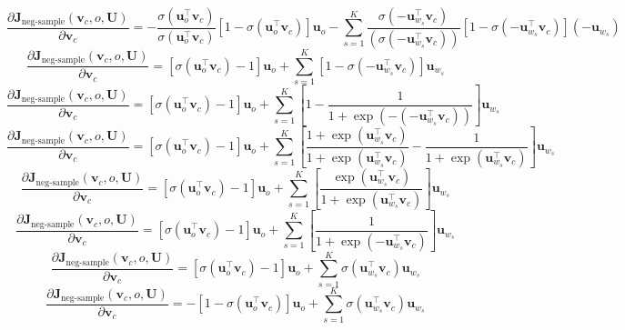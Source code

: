\documentclass[12pt]{article}
\begin{document}
\begin{equation*}
    \frac{\partial \bm J_{\text{neg-sample}}(\bm v_c, o, \bm U)}{\partial \bm v_c} = 
    - \frac{\sigma(\bm u_o^\top \bm v_c)}{\sigma(\bm u_o^\top \bm v_c)} 
    [1 - \sigma(\bm u_o^\top \bm v_c)] \bm u_o -
    \sum_{s=1}^K \frac{\sigma(-\bm u_{w_s}^\top \bm v_c)}{(\sigma(-\bm u_{w_s}^\top \bm v_c))}
    [1 - \sigma(-\bm u_{w_s}^\top \bm v_c)]
    (- \bm u_{w_s})
\end{equation*}
\begin{equation*}
    \frac{\partial \bm J_{\text{neg-sample}}(\bm v_c, o, \bm U)}{\partial \bm v_c} = 
    [\sigma(\bm u_o^\top \bm v_c) - 1] \bm u_o +
    \sum_{s=1}^K [1 - \sigma(-\bm u_{w_s}^\top \bm v_c)]
    \bm u_{w_s}
\end{equation*}
\begin{equation*}
    \frac{\partial \bm J_{\text{neg-sample}}(\bm v_c, o, \bm U)}{\partial \bm v_c} = 
    [\sigma(\bm u_o^\top \bm v_c) - 1] \bm u_o +
    \sum_{s=1}^K [1 - \frac{1}{1 + \exp(-(-\bm u_{w_s}^\top \bm v_c))}]
    \bm u_{w_s}
\end{equation*}
\begin{equation*}
    \frac{\partial \bm J_{\text{neg-sample}}(\bm v_c, o, \bm U)}{\partial \bm v_c} = 
    [\sigma(\bm u_o^\top \bm v_c) - 1] \bm u_o +
    \sum_{s=1}^K [\frac{1 + \exp(\bm u_{w_s}^\top \bm v_c)}{1 + \exp(\bm u_{w_s}^\top \bm v_c)}
    - \frac{1}{1 + \exp(\bm u_{w_s}^\top \bm v_c)}]
    \bm u_{w_s}
\end{equation*}
\begin{equation*}
    \frac{\partial \bm J_{\text{neg-sample}}(\bm v_c, o, \bm U)}{\partial \bm v_c} = 
    [\sigma(\bm u_o^\top \bm v_c) - 1] \bm u_o +
    \sum_{s=1}^K [\frac{\exp(\bm u_{w_s}^\top \bm v_c)}{1 + \exp(\bm u_{w_s}^\top \bm v_c)}]
    \bm u_{w_s}
\end{equation*}
\begin{equation*}
    \frac{\partial \bm J_{\text{neg-sample}}(\bm v_c, o, \bm U)}{\partial \bm v_c} = 
    [\sigma(\bm u_o^\top \bm v_c) - 1] \bm u_o +
    \sum_{s=1}^K [\frac{1}{1 + \exp(-\bm u_{w_s}^\top \bm v_c)}]
    \bm u_{w_s}
\end{equation*}
\begin{equation*}
    \frac{\partial \bm J_{\text{neg-sample}}(\bm v_c, o, \bm U)}{\partial \bm v_c} = 
    [\sigma(\bm u_o^\top \bm v_c) - 1] \bm u_o +
    \sum_{s=1}^K \sigma (\bm u_{w_s}^\top \bm v_c) \bm u_{w_s}
\end{equation*}
\begin{equation*}
    \frac{\partial \bm J_{\text{neg-sample}}(\bm v_c, o, \bm U)}{\partial \bm v_c} = 
    -[1 - \sigma(\bm u_o^\top \bm v_c)] \bm u_o +
    \sum_{s=1}^K \sigma (\bm u_{w_s}^\top \bm v_c) \bm u_{w_s}
\end{equation*}
\end{document}
